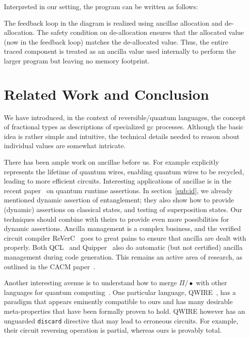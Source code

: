 \documentclass[sigplan,10pt,review,anonymous]{acmart}
\begin{document}
Interpreted in our setting, the program can be written as follows:

\PPFTtraceex{}

The feedback loop in the diagram is realized using ancillae allocation
and de-allocation. The safety condition on de-allocation ensures that
the allocated value (now in the feedback loop) matches the
de-allocated value. Thus, the entire traced component is treated as an
ancilla value used internally to perform the larger program but
leaving no memory footprint.


\section{Related Work and Conclusion}

We have introduced, in the context of reversible/quantum languages,
the concept of fractional types as descriptions of specialized gc
processes. Although the basic idea is rather simple and intuitive, the
technical details needed to reason about individual values are
somewhat intricate.

There has been ample work on ancillae before us.  For example
\cite{PhysRevA.94.042337} explicitly represents the lifetime of
quantum wires, enabling quantum wires to be recycled, leading
to more efficient circuits.  Interesting applications of
ancillae is in the recent paper~\cite{DBLP:journals/cal/ZhouB19}
on quantum runtime assertions.  In section~\ref{sub:id}, we
already mentioned dynamic assertion of entanglement; they
also show how to provide (dynamic) assertions on classical
states, and testing of superposition states.  Our techniques
should combine with theirs to provide even more possibilities
for dynamic assertions. Ancilla management is a complex
business, and the verified circuit compiler
ReVerC~\cite{amy2017verified} goes to great pains to
ensure that ancilla are dealt with properly.  Both
QCL~\cite{omer2002procedural} and Quipper~\cite{Green:2013:QSQ:2491956.2462177}
also do automatic (but not certified) ancilla management during code
generation.  This remains an active area of research, as
outlined in the CACM paper~\cite{valiron2015programming}.

Another interesting avenue is to understand how to merge $\Pi/\bullet$
with other languages for quantum
computing~\cite{dblp:journals/mscs/selingerv06,vantonder:2004,dowek2017lineal}. One
particular language, QWIRE~\cite{Paykin:2017:QCL:3009837.3009894}, has
a paradigm that appears eminently compatible to ours and has many
desirable meta-properties that have been formally proven to hold.
QWIRE however has an unguarded \texttt{discard} directive that may
lead to erroneous circuits. For example, their circuit reversing
operation is partial, whereas ours is provably total.
\end{document}
